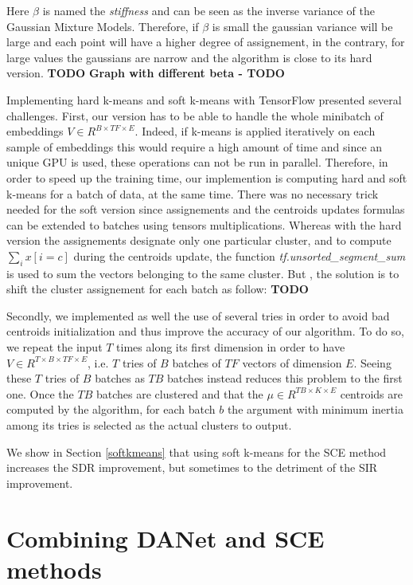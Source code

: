 \documentclass[master, tikz, final,11pt, dvipdfmx]{iscs-thesis}
\begin{document}
Here $\beta$ is named the \textit{stiffness} and can be seen as the inverse variance of the Gaussian Mixture Models. Therefore, if $\beta$ is small the gaussian variance will be large and each point will have a higher degree of assignement, in the contrary, for large values the gaussians are narrow and the algorithm is close to its hard version.
\textbf{TODO}
\textbf{Graph with different beta - TODO}

Implementing hard k-means and soft k-means with TensorFlow presented several challenges. First, our version has to be able to handle the whole minibatch of embeddings $V\in R^{B\times TF \times E}$. Indeed, if k-means is applied iteratively on each sample of embeddings this would require a high amount of time and since an unique GPU is used, these operations can not be run in parallel. Therefore, in order to speed up the training time, our implemention is computing hard and soft k-means for a batch of data, at the same time. There was no necessary trick needed for the soft version since assignements and the centroids updates formulas can be extended to batches using tensors multiplications. Whereas with the hard version the assignements designate only one particular cluster, and to compute $\sum_i x[i = c]$ during the centroids update, the function \textit{tf.unsorted\_segment\_sum} is used to sum the vectors belonging to the same cluster. But , the solution is to shift the cluster assignement for each batch as follow:
\textbf{TODO}

Secondly, we implemented as well the use of several tries in order to avoid bad centroids initialization and thus improve the accuracy of our algorithm. To do so, we repeat the input $T$ times along its first dimension in order to have $V\in R^{T \times B\times TF \times E}$, i.e. $T$ tries of $B$ batches of $TF$ vectors of dimension $E$. Seeing these $T$ tries of $B$ batches as $TB$ batches instead reduces this problem to the first one. Once the $TB$ batches are clustered and that the $\mu \in R^{TB\times K \times E}$ centroids are computed by the algorithm, for each batch $b$ the argument with minimum inertia among its tries is selected as the actual clusters to output.

We show in Section \ref{softkmeans} that using soft k-means for the SCE method increases the SDR improvement, but sometimes to the detriment of the SIR improvement.



\section{Combining DANet and SCE methods}
\label{contrib:danet}
\end{document}
